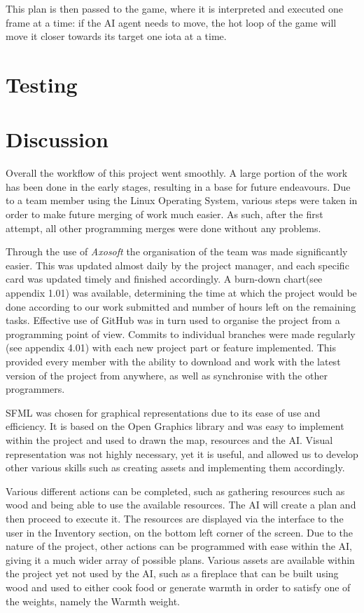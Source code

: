 \documentclass[a4paper]{report}
\begin{document}
This plan is then passed to the game, where it is interpreted and executed one frame at a time: if the AI agent needs to move, the hot loop of the game will move it closer towards its target one iota at a time.

\chapter{Testing}
\chapter{Discussion}
Overall the workflow of this project went smoothly. A large portion of the work has been done in the early stages, resulting in a base for future endeavours. Due to a team member using the Linux Operating System, various steps were taken in order to make future merging of work much easier. As such, after the first attempt, all other programming merges were done without any problems. 

Through the use of \textit{Axosoft} the organisation of the team was made significantly easier. This was updated almost daily by the project manager, and each specific card was updated timely and finished accordingly. A burn-down chart(see appendix 1.01) was available, determining the time at which the project would be done according to our work submitted and number of hours left on the remaining tasks. Effective use of GitHub was in turn used to organise the project from a programming point of view. Commits to individual branches were made regularly (see appendix 4.01) with each new project part or feature implemented. This provided every member with the ability to download and work with the latest version of the project from anywhere, as well as synchronise with the other programmers.

SFML was chosen for graphical representations due to its ease of use and efficiency. It is based on the Open Graphics library and was easy to implement within the project and used to drawn the map, resources and the AI. Visual representation was not highly necessary, yet it is useful, and allowed us to develop other various skills such as creating assets and implementing them accordingly.

Various different actions can be completed, such as gathering resources such as wood and being able to use the available resources. The AI will create a plan and then proceed to execute it. The resources are displayed via the interface to the user in the Inventory section, on the bottom left corner of the screen. Due to the nature of the project, other actions can be programmed with ease within the AI, giving it a much wider array of possible plans. Various assets are available within the project yet not used by the AI, such as a fireplace that can be built using wood and used to either cook food or generate warmth in order to satisfy one of the weights, namely the Warmth weight.
\end{document}
